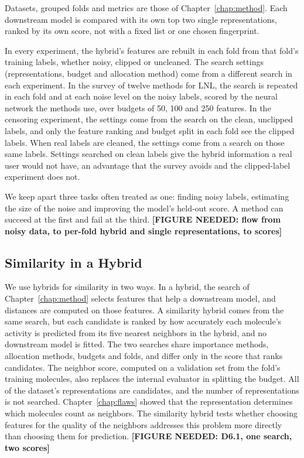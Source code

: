 Datasets, grouped folds and metrics are those of Chapter~\ref{chap:method}. Each downstream model is compared with its own top two single representations, ranked by its own score, not with a fixed list or one chosen fingerprint.

In every experiment, the hybrid's features are rebuilt in each fold from that fold's training labels, whether noisy, clipped or uncleaned. The search settings (representations, budget and allocation method) come from a different search in each experiment. In the survey of twelve methods for LNL, the search is repeated in each fold and at each noise level on the noisy labels, scored by the neural network the methods use, over budgets of 50, 100 and 250 features. In the censoring experiment, the settings come from the search on the clean, unclipped labels, and only the feature ranking and budget split in each fold see the clipped labels. When real labels are cleaned, the settings come from a search on those same labels. Settings searched on clean labels give the hybrid information a real user would not have, an advantage that the survey avoids and the clipped-label experiment does not.

We keep apart three tasks often treated as one: finding noisy labels, estimating the size of the noise and improving the model's held-out score. A method can succeed at the first and fail at the third. \textbf{[FIGURE NEEDED: flow from noisy data, to per-fold hybrid and single representations, to scores]}



\subsection{Similarity in a Hybrid}\label{sec:similarity:hybrid_similarity}

We use hybrids for similarity in two ways. In a hybrid, the search of Chapter~\ref{chap:method} selects features that help a downstream model, and distances are computed on those features. A similarity hybrid comes from the same search, but each candidate is ranked by how accurately each molecule's activity is predicted from its five nearest neighbors in the hybrid, and no downstream model is fitted. The two searches share importance methods, allocation methods, budgets and folds, and differ only in the score that ranks candidates. The neighbor score, computed on a validation set from the fold's training molecules, also replaces the internal evaluator in splitting the budget. All of the dataset's representations are candidates, and the number of representations is not searched. Chapter~\ref{chap:flaws} showed that the representation determines which molecules count as neighbors. The similarity hybrid tests whether choosing features for the quality of the neighbors addresses this problem more directly than choosing them for prediction. \textbf{[FIGURE NEEDED: D6.1, one search, two scores]}

